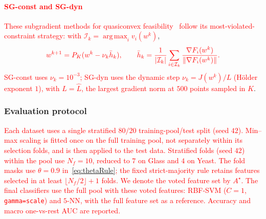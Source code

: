 \documentclass[]{interact}
\theoremstyle{plain}
\theoremstyle{definition}
\theoremstyle{remark}
\DeclareMathOperator*{\argmax}{arg\,max}
\begin{document}
\paragraph*{\textcolor{red}{SG-const and SG-dyn}}
\leavevmode\textcolor{red}{These subgradient methods for quasiconvex feasibility~\citep{hu2022quasi} follow its
most-violated-constraint strategy: with $\mathcal I_k=\argmax_i v_i(w^k)$},
\[\textcolor{red}{
w^{k+1}=P_K(w^k-\nu_k\bar h_k),\qquad
\bar h_k=\frac1{|\mathcal I_k|}\sum_{i\in\mathcal I_k}\frac{\nabla F_i(w^k)}{\|\nabla F_i(w^k)\|}.
}\]
\leavevmode\textcolor{red}{SG-const uses $\nu_k=10^{-3}$; SG-dyn uses the dynamic step $\nu_k=J(w^k)/L$ (H\"older
exponent $1$), with $L=\widehat L$, the largest gradient norm at $500$ points sampled in $K$}.



\subsubsection{Evaluation protocol}\label{sssec:protocol}
\leavevmode\textcolor{red}{Each dataset uses a single stratified $80/20$ training-pool/test split
(seed $42$). Min--max scaling is fitted once on the full training pool, not
separately within its selection folds, and is then applied to the test data.
Stratified folds (seed $42$) within the pool use $N_f=10$, reduced to $7$ on Glass
and $4$ on Yeast. The fold masks use $\theta=0.9$ in~\eqref{eq:thetaRule};
the fixed strict-majority rule retains features selected in at least
$\lfloor N_f/2\rfloor+1$ folds. We denote the voted feature set by $A^\star$. The final classifiers use the full pool with these
voted features: RBF-SVM ($C=1$, \texttt{gamma=scale}) and $5$-NN, with the full
feature set as a reference. Accuracy and macro one-vs-rest AUC are reported.}
\end{document}
